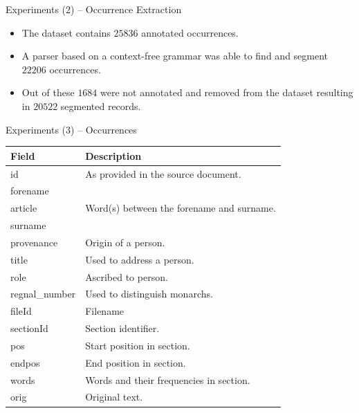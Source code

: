 \documentclass[12pt]{beamer}
\theoremstyle{break}
\begin{document}


\begin{frame}{Experiments (2) -- Occurrence Extraction}

	\begin{itemize}
		\item The dataset contains $25 836$ 	annotated occurrences.
		\item A parser based on a context-free grammar was able to find and segment $22 206$ occurrences.
		\item Out of these $1684$ were not annotated and removed from the dataset resulting in $20 522$ segmented records.
		\end{itemize}

\end{frame}




\begin{frame}{Experiments (3) -- Occurrences}

\begin{table}
	\footnotesize
    \centering
    \begin{tabular}{l l}
        \toprule
        \textbf{Field} & \textbf{Description}\\
        \midrule
        id & As provided in the source document.\\
        forename & \\
        article & Word(s) between the forename and surname.\\
        surname & \\
        provenance & Origin of a person.\\
        title & Used to address a person. \\
        role & Ascribed to person.\\
        regnal\_number & Used to distinguish monarchs.\\
        fileId & Filename \\
        sectionId & Section identifier. \\
        pos & Start position in section. \\
        endpos & End position in section. \\
        words & Words and their frequencies in section.\\
        orig & Original text.\\
        \bottomrule
    \end{tabular}
\end{table}

\end{frame}
\end{document}
